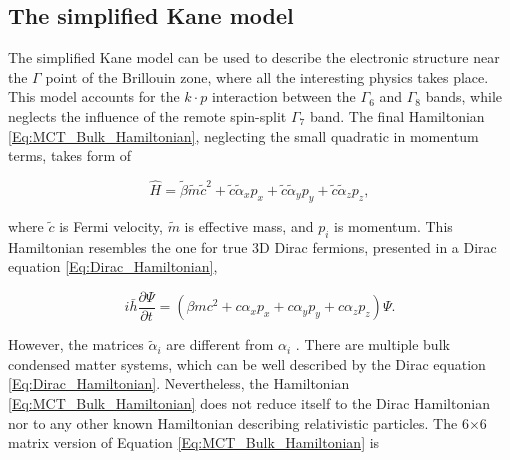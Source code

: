 \documentclass[titlepage,a4paper]{book}
\newcommand{\wciecie}{\quad\phantom{v}}
\begin{document}
\subsection{The simplified Kane model}
\wciecie
The simplified Kane model \cite{Kane_MCT}\cite{Kane_Model} can be used to describe the electronic structure near the $\Gamma$ point of the Brillouin zone, where all the interesting physics takes place. This model accounts for the $k\cdot p$ interaction between the $\Gamma_6$ and $\Gamma_8$ bands, while neglects the influence of the remote spin-split $\Gamma_7$ band. The final Hamiltonian \ref{Eq:MCT_Bulk_Hamiltonian}, neglecting the small quadratic in momentum terms, takes form of

\begin{equation}
\label{Eq:MCT_Bulk_Hamiltonian}
\hat{H} = \tilde{\beta} \tilde{m}\tilde{c}^2 + \tilde{c}\tilde{\alpha}_x p_x + \tilde{c}\tilde{\alpha}_y p_y + \tilde{c}\tilde{\alpha}_z p_z ,
\end{equation}

where $\tilde{c}$ is Fermi velocity, $\tilde{m}$ is effective mass, and $p_i$ is momentum. This Hamiltonian resembles the one for true 3D Dirac fermions, presented in a Dirac equation \ref{Eq:Dirac_Hamiltonian}, 

\begin{equation}
\label{Eq:Dirac_Hamiltonian}
i\bar{h} \frac{\partial \Psi}{\partial t} = \left( \beta mc^2 + c\alpha_x p_x + c\alpha_y p_y + c\alpha_z p_z \right) \Psi.
\end{equation}

However, the matrices $\tilde{\alpha}_i$ are different from $\alpha_i$ \cite{Teppe_MCT}. There are multiple bulk condensed matter systems, which can be well described by the Dirac equation \ref{Eq:Dirac_Hamiltonian}. Nevertheless, the Hamiltonian \ref{Eq:MCT_Bulk_Hamiltonian} does not reduce itself to the Dirac Hamiltonian nor to any other known Hamiltonian describing relativistic particles. The 6$\times$6 matrix version of Equation \ref{Eq:MCT_Bulk_Hamiltonian} is
\end{document}
